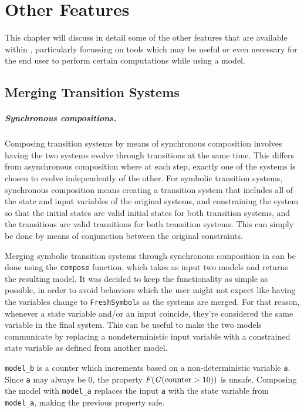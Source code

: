 \chapter{Other Features}
This chapter will discuss in detail some of the other features that are available within \pyvmt{}, particularly focussing on tools which may be useful or even necessary for the end user to perform certain computations while using a model.

\section{Merging Transition Systems}
\paragraph*{Synchronous compositions.}
Composing transition systems by means of synchronous composition involves having the two systems evolve through transitions at the same time.
This differs from asynchronous composition where at each step, exactly one of the systems is chosen to evolve independently of the other.
For symbolic transition systems, synchronous composition means creating a transition system that includes all of the state and input variables of the original systems, and constraining the system so that the initial states are valid initial states for both transition systems, and the transitions are valid transitions for both transition systems.
This can simply be done by means of conjunction between the original constraints.

Merging symbolic transition systems through synchronous composition in \pyvmt{} can be done using the \texttt{compose} function, which takes as input two models and returns the resulting model.
It was decided to keep the functionality as simple as possible, in order to avoid behaviors which the user might not expect like having the variables change to \texttt{FreshSymbol}s as the systems are merged.
For that reason, whenever a state variable and/or an input coincide, they're considered the same variable in the final system.
This can be useful to make the two models communicate by replacing a nondeterministic input variable with a constrained state variable as defined from another model.

\begin{listing}
    \label{alg:composition}
    \caption{\texttt{model\_b} is a counter which increments based on a non-deterministic variable \texttt{a}. Since \texttt{a} may always be 0, the property $\F (\G (\mathrm{counter} > 10))$ is unsafe.
    Composing the model with \texttt{model\_a} replaces the input \texttt{a} with the state variable from \texttt{model\_a}, making the previous property safe.}
\end{listing}

